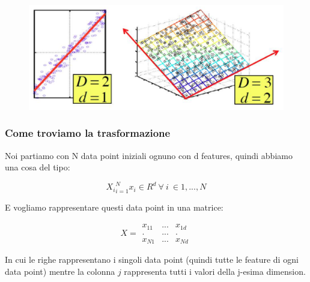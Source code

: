 \documentclass[14pt]{extreport}
\begin{document}
\begin{figure}[H]
\centering
\includegraphics[width=0.7\linewidth]{442.jpeg}
\end{figure}

\subsubsection{Come troviamo la trasformazione}

Noi partiamo con N data point iniziali ognuno con d features, quindi abbiamo una cosa del tipo:

$${X_i}_{i=1}^N x_i \in R^d \ \forall \ i \ \in {1,...,N}$$

E vogliamo rappresentare questi data point in una matrice:

\begin{equation}
	X = \begin{matrix}
	x_{11} & ... & x_{1d} \\
	. & ... & . \\
	x_{N1} & ... & x_{Nd}
	\end{matrix}
	\end{equation}

In cui le righe rappresentano i singoli data point (quindi tutte le feature di ogni data point)
mentre la colonna $j$ rappresenta tutti i valori della j-esima dimension.
\end{document}
